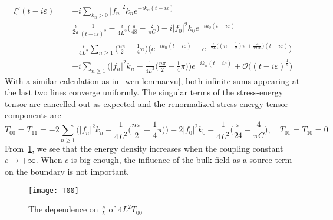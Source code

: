 \begin{equation*}
\begin{split}
\xi'(t  - i\varepsilon)  = & -i\sum_{k_n>0}|f_n|^2k_n e^{-ik_n(t-i\varepsilon)} \\
%
= & \frac{i}{2\pi}\frac{1}{(t-i\varepsilon)^2}  
-\frac{i}{4L^2}\big(\frac{\pi}{48} - \frac{2}{\pi C} \big)
- i |f_0|^2k_0e^{-ik_0(t-i\varepsilon)}
\\
% 
& -\frac{i}{4L^2}\sum_{n\geq1}\Big(\frac{n\pi}{2} - \frac 1 4 \pi\Big)
\bigg(e^{-ik_n(t-i\varepsilon)}
-e^{-\frac{i}{2L}\big((n-\frac 1 2 )\pi + \frac{4}{\pi C n} \big)(t-i\varepsilon)} \bigg) \\
&-i \sum_{n \geq 1} \Big( |f_n|^2 k_n - \frac{1}{4L^2}\big(\frac{n\pi}{2} - \frac 1 4 \pi \big) \Big) e^{-ik_n(t-i\varepsilon)}
+\mathcal{O}\big((t-i\varepsilon)^{\frac{1}{2}}\big)
\end{split}
\end{equation*}
With a similar calculation as in~\cref{wen-lemmacvu}, both infinite sums appearing at the last two lines converge uniformly.
The singular terms of the stress-energy tensor are cancelled out as expected and the renormalized stress-energy tensor components are
\begin{equation*}
T_{00} = T_{11}= - 2 \sum_{n \geq 1} \Big( |f_n|^2 k_n - 
\frac{1}{4L^2}\big(\frac{n\pi}{2} - \frac 1 4 \pi \big) \Big)
-2|f_0|^2k_0-\frac{1}{4L^2}\big(\frac{\pi}{24} - \frac{4}{\pi C}\big)
 , \quad
T_{01}=T_{10}  = 0
\end{equation*}
From~\cref{plotex1d}, we see that the energy density increases when the coupling constant $c\rightarrow+\infty$. 
When $c$ is big enough, the influence of the bulk field as a source term on the boundary is not important.
%
\begin{figure}[!h]
  \centering
  \texttt{[image: T00]}
  \caption{The dependence on $\frac{c}{L}$ of $4L^2T_{00}$}\label{plotex1d}
\end{figure}
%










